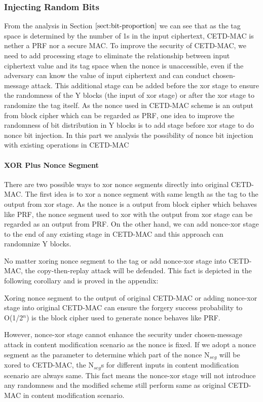  \subsubsection{Injecting Random Bits}
 From the analysis in Section $\ref{sect:bit-proportion}$ we can see that as the tag space is determined by the number of 1s in the input ciphertext, CETD-MAC is nether a PRF nor a secure MAC. To improve the security of CETD-MAC, we need to add processing stage to eliminate the relationship between input ciphertext value and its tag space when the nonce is unaccessible, even if the adversary can know the value of input ciphertext and can conduct chosen-message attack. This additional stage can be added before the xor stage to ensure the randomness of the Y blocks (the input of xor stage) or after the xor stage to randomize the tag itself.
As the nonce used in CETD-MAC scheme is an output from block cipher which can be regarded as PRF, one idea to improve the randomness of bit distribution in Y blocks is to add stage before xor stage to do nonce bit injection. In this part we analysis the possibility of nonce bit injection with existing operations in CETD-MAC
 \paragraph{XOR Plus Nonce Segment}
There are two possible ways to xor nonce segments directly into original CETD-MAC. The first idea is to xor a nonce segment with same length as the tag to the output from xor stage. As the nonce is a output from block cipher which behaves like PRF, the nonce segment used to xor with the output from xor stage can be regarded as an output from PRF. On the other hand, we can add nonce-xor stage to the end of any existing stage in CETD-MAC and this approach can randomnize Y blocks. 

No matter xoring nonce segment to the tag or add nonce-xor stage into CETD-MAC, the copy-then-replay attack will be defended. This fact is depicted in the following corollary and is proved in the appendix:
\begin{corollary}\label{coro:xor-nonce}
Xoring nonce segment to the output of original CETD-MAC or adding nonce-xor stage into original CETD-MAC can ensure the forgery success probability to O(1/2$^n$) is the block cipher used to generate nonce behaves like PRF.
\end{corollary}

However, nonce-xor stage cannot enhance the security under chosen-message attack in content modification scenario as the nonce is fixed. If we adopt a nonce segment as the parameter to determine which part of the nonce N$_{seg}$ will be xored to CETD-MAC, the N$_{seg}$s for different inputs in content modification scenario are always same. This fact means the nonce-xor stage will not introduce any randomness and the modified scheme still perform same as original CETD-MAC in content modification scenario.
